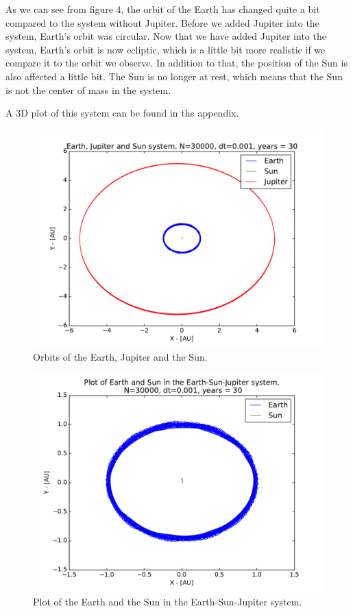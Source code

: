 \documentclass[12pt]{article}
\begin{document}
As we can see from figure 4, the orbit of the Earth has changed quite a bit compared to the system without Jupiter. Before we added Jupiter into the system, Earth's orbit was circular. Now that we have added Jupiter into the system, Earth's orbit is now ecliptic, which is a little bit more realistic if we compare it to the orbit we observe. In addition to that, the position of the Sun is also affected a little bit. The Sun is no longer at rest, which means that the Sun is not the center of mass in the system.

A 3D plot of this system can be found in the appendix.

\begin{figure}[hbtp]
\centering
\includegraphics[width=\linewidth]{Plots/Earth_Sun_Jupiter.pdf}
\caption{Orbits of the Earth, Jupiter and the Sun.}
\end{figure}

\begin{figure}[hbtp]
\centering
\includegraphics[width=\linewidth]{Plots/ESJ_EarthandSun.pdf}
\caption{Plot of the Earth and the Sun in the Earth-Sun-Jupiter system.}
\end{figure}
\end{document}
